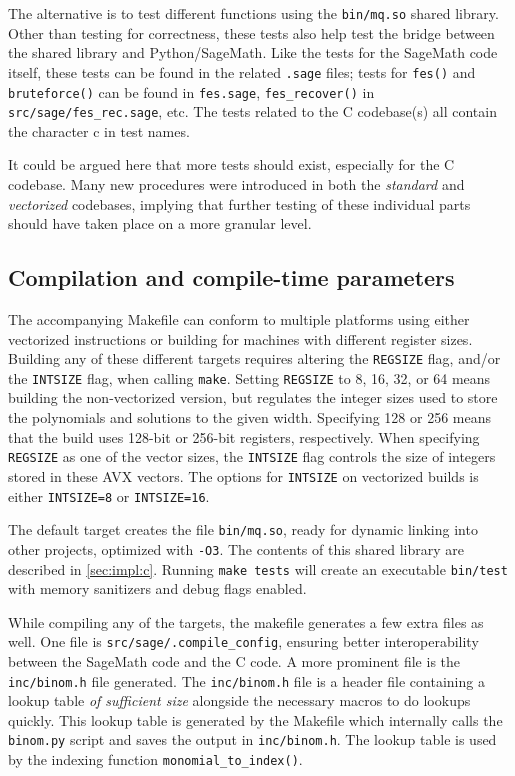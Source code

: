The alternative is to test different functions using the \texttt{bin/mq.so} shared library. Other than testing for correctness, these tests also help test the bridge between the shared library and Python/SageMath. Like the tests for the SageMath code itself, these tests can be found in the related \texttt{.sage} files; tests for \texttt{fes()} and \texttt{bruteforce()} can be found in \texttt{fes.sage}, \texttt{fes\_recover()} in \texttt{src/sage/fes\_rec.sage}, etc. The tests related to the C codebase(s) all contain the character c in test names.

It could be argued here that more tests should exist, especially for the C codebase. Many new procedures were introduced in both the \textit{standard} and \textit{vectorized} codebases, implying that further testing of these individual parts should have taken place on a more granular level. 

\subsection{Compilation and compile-time parameters} \label{sec:impl:compile}
The accompanying Makefile can conform to multiple platforms using either vectorized instructions or building for machines with different register sizes. Building any of these different targets requires altering the \texttt{REGSIZE} flag, and/or the \texttt{INTSIZE} flag, when calling \texttt{make}. Setting \texttt{REGSIZE} to 8, 16, 32, or 64 means building the non-vectorized version, but regulates the integer sizes used to store the polynomials and solutions to the given width. Specifying 128 or 256 means that the build uses 128-bit or 256-bit registers, respectively. When specifying \texttt{REGSIZE} as one of the vector sizes, the \texttt{INTSIZE} flag controls the size of integers stored in these AVX vectors. The options for \texttt{INTSIZE} on vectorized builds is either \texttt{INTSIZE=8} or \texttt{INTSIZE=16}.

The default target creates the file \texttt{bin/mq.so}, ready for dynamic linking into other projects, optimized with \texttt{-O3}. The contents of this shared library are described in \cref{sec:impl:c}. Running \texttt{make tests} will create an executable \texttt{bin/test} with memory sanitizers and debug flags enabled. 

While compiling any of the targets, the makefile generates a few extra files as well. One file is \texttt{src/sage/.compile\_config}, ensuring better interoperability between the SageMath code and the C code. A more prominent file is the \texttt{inc/binom.h} file generated. The \texttt{inc/binom.h} file is a header file containing a lookup table \textit{of sufficient size} alongside the necessary macros to do lookups quickly. This lookup table is generated by the Makefile which internally calls the \texttt{binom.py} script and saves the output in \texttt{inc/binom.h}. The lookup table is used by the indexing function \texttt{monomial\_to\_index()}.

